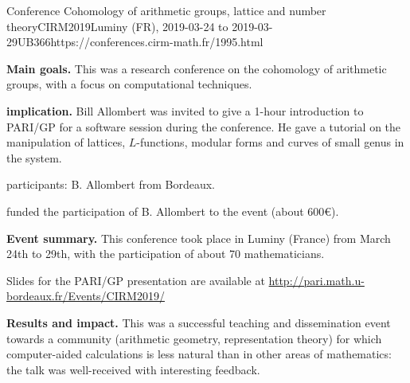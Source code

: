 \begin{event}{Conference Cohomology of arithmetic groups, lattice and number
  theory}{CIRM2019}{Luminy (FR),
  2019-03-24 to
  2019-03-29}{UB}{36}{6}{https://conferences.cirm-math.fr/1995.html}
  
\textbf{Main goals.} This was a research conference on the cohomology of
arithmetic groups, with a focus on computational techniques.

\textbf{\ODK implication.} Bill Allombert was invited to give a 1-hour
introduction to PARI/GP for a software session during the conference.
He gave a tutorial on the manipulation of lattices, $L$-functions,
modular forms and curves of small genus in the system.

\ODK participants: B. Allombert from Bordeaux.

\ODK funded the participation of B. Allombert to the event (about 600\euro).

\textbf{Event summary.} This conference took place in Luminy (France)
from March 24th to 29th, with the participation of about 70 mathematicians.

Slides for the PARI/GP presentation are available at
\url{http://pari.math.u-bordeaux.fr/Events/CIRM2019/}

\textbf{Results and impact.} This was a successful teaching and dissemination
event towards a community (arithmetic geometry, representation theory)
for which computer-aided calculations is less natural than in other
areas of mathematics: the talk was well-received with interesting
feedback.
\end{event}
